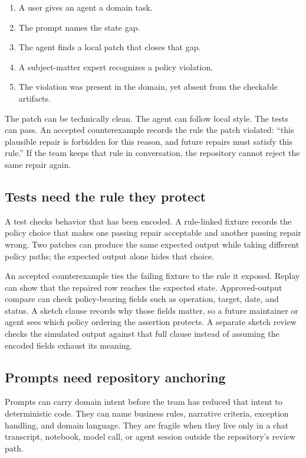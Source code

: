 \documentclass[11pt]{article}
\begin{document}
\begin{enumerate}
  \item A user gives an agent a domain task.
  \item The prompt names the state gap.
  \item The agent finds a local patch that closes that gap.
  \item A subject-matter expert recognizes a policy violation.
  \item The violation was present in the domain, yet absent from the checkable artifacts.
\end{enumerate}

The patch can be technically clean.  The agent can follow local style.  The tests can pass.
An accepted counterexample records the rule the patch violated: ``this plausible repair is
forbidden for this reason, and future repairs must satisfy this rule.''  If the team keeps
that rule in conversation, the repository cannot reject the same repair again.

\subsection{Tests need the rule they protect}

A test checks behavior that has been encoded.  A rule-linked fixture records the policy
choice that makes one passing repair acceptable and another passing repair wrong.  Two
patches can produce the same expected output while taking different policy paths; the
expected output alone hides that choice.

An accepted counterexample ties the failing fixture to the rule it exposed.  Replay can show
that the repaired row reaches the expected state.  Approved-output compare can check policy-bearing
fields such as operation, target, date, and status.  A sketch clause records why those fields
matter, so a future maintainer or agent sees which policy ordering the assertion protects.  A
separate sketch review checks the simulated output against that full clause instead of assuming
the encoded fields exhaust its meaning.

\subsection{Prompts need repository anchoring}

Prompts can carry domain intent before the team has reduced that intent to deterministic
code.  They can name business rules, narrative criteria, exception handling, and domain
language.  They are fragile when they live only in a chat transcript, notebook, model call, or
agent session outside the repository's review path.
\end{document}

